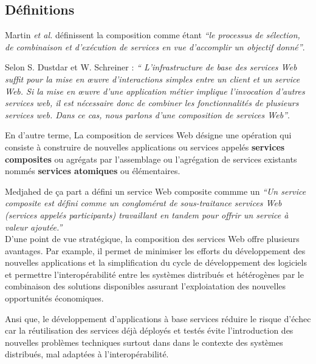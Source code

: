     \subsection{Définitions}
    \label{sec:definitions}

    Martin \emph{et al.} \cite{martin2004owl} définissent
    la composition comme étant \emph{``le processus de sélection, de
      combinaison et d'exécution de services en vue
      d'accomplir un objectif donné''}.

    Selon S. Dustdar et W. Schreiner \cite{dustdar2005survey} :
    \emph{`` L'infrastructure de base des services Web suffit pour la
      mise en œuvre d'interactions simples entre un client et un
      service Web. Si la mise en œuvre d'une application métier
      implique l'invocation d'autres services web, il est nécessaire
      donc de combiner les fonctionnalités de plusieurs services
      web. Dans ce cas, nous parlons d'une composition de services
      Web''}.

    En d'autre terme, La composition de services Web désigne une
    opération qui consiste à construire de nouvelles applications ou
    services appelés \textbf{services composites} ou agrégats par
    l'assemblage ou l'agrégation de services existants nommés
    \textbf{services atomiques} ou élémentaires.

    Medjahed \cite{medjahed2004thesis}de ça part a défini un service
    Web composite commme un \emph{``Un service composite est défini
      comme un conglomérat de sous-traitance services Web (services
      appelés participants) travaillant en tandem pour offrir un
      service à valeur ajoutée.''}\\

    D'une point de vue stratégique, la composition des services Web
    offre plusieurs avantages. Par example, il permet de minimiser les
    efforts du développement des nouvelles applications et la
    simplification du cycle de développement des logiciels et
    permettre l'interopérabilité entre les systèmes distribués et
    hétérogènes par le combinaison des solutions disponibles assurant
    l'exploiatation des nouvelles opportunités économiques.

    Ansi que, le développement d'applications à base services
    réduire le risque d'échec car la réutilisation des services déjà
    déployés et testés évite l'introduction des nouvelles problèmes
    techniques surtout dans dans le contexte des systèmes distribués,
    mal adaptées à l'interopérabilité.

